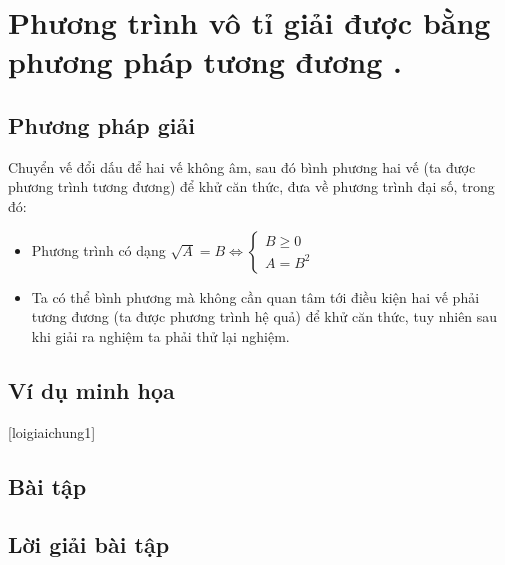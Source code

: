 \section{Phương trình vô tỉ giải được bằng phương pháp tương đương .}
  \subsection{Phương pháp giải }
    Chuyển vế đổi dấu để hai vế không âm, sau đó bình phương hai vế (ta được phương trình tương đương) để khử căn thức, đưa về phương trình đại số, trong đó: 
        \begin{itemize}
          \item Phương trình có dạng $	\sqrt{A}=B \Leftrightarrow \begin{cases} B \geq 0 \\ A = B^2 \end{cases}$
          \item Ta có thể bình phương mà không cần quan tâm tới điều kiện hai vế phải tương đương (ta được phương trình hệ quả) để khử căn thức, tuy nhiên sau khi giải ra nghiệm ta phải thử lại nghiệm.

        \end{itemize} 
      \subsection{Ví dụ minh họa}
		
	
	[loigiaichung1]
	\vspace*{1cm}
 	\subsection{Bài tập } %
		
	\subsection*{Lời giải bài tập }
 	
